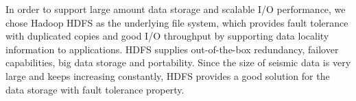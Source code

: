 
In order to support large amount data storage and scalable I/O performance, we chose Hadoop HDFS as the underlying file system, which provides fault tolerance with duplicated copies and good I/O throughput by supporting data locality information to applications. HDFS supplies out-of-the-box redundancy, failover capabilities, big data storage and portability. Since the size of seismic data is very large and keeps increasing constantly, HDFS provides a good solution for the data storage with fault tolerance property.


